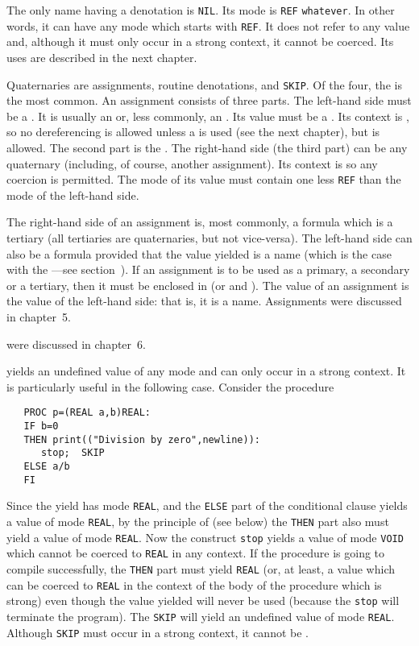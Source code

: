 The only name having a denotation is \verb|NIL|. Its mode is
\verb|REF| \verb|whatever|. In other words, it can have any mode
which starts with \verb|REF|. It does not refer to any value and,
although it must only occur in a strong context, it cannot be
coerced. Its uses are described in the next chapter.

Quaternaries are assignments, routine denotations,
 and \verb|SKIP|. Of the
four, the  is the most common.  An assignment consists
of three parts. The left-hand side must be a . It is
usually an  or, less commonly, an
. Its value must be a .
Its context is , so no dereferencing is
allowed unless a  is used (see the next chapter), but
 is allowed.  The second
part is the .  The right-hand side (the third
part) can be any quaternary (including, of course, another
assignment). Its context is  so any
coercion is permitted.  The mode of its value must contain one less
\verb|REF| than the mode of the left-hand side.

The right-hand side of an assignment is, most commonly, a formula
which is a tertiary (all tertiaries are quaternaries, but not
vice-versa).  The left-hand side can also be a formula provided that
the value yielded is a name (which is the case with the ---see section~). If an assignment is to
be used as a primary, a secondary or a tertiary, then it must be
enclosed in (or  and ).  The
value of an assignment is the value of the left-hand side: that is,
it is a name.  Assignments were discussed in chapter~5.

 were discussed in
chapter~6.

 yields an undefined value of any mode
and can only occur in a strong context. It is particularly useful in
the following case. Consider the procedure
\begin{verbatim}
   PROC p=(REAL a,b)REAL:
   IF b=0
   THEN print(("Division by zero",newline)):
      stop;  SKIP
   ELSE a/b
   FI
\end{verbatim}
\noindent
Since the yield has mode \verb|REAL|, and the \verb|ELSE| part of the
conditional clause yields a value of mode \verb|REAL|, by the principle
of  (see below) the \verb|THEN| part also
must yield a value of mode \verb|REAL|.  Now the construct \verb|stop|
yields a value of mode \verb|VOID| which cannot be coerced to
\verb|REAL| in any context.  If the procedure is going to compile
successfully, the \verb|THEN| part must yield \verb|REAL| (or, at
least, a value which can be coerced to \verb|REAL| in the context of
the body of the procedure which is strong) even though the value
yielded will never be used (because the \verb|stop| will terminate the
program).  The \verb|SKIP| will yield an undefined value of mode
\verb|REAL|.  Although \verb|SKIP| must occur in a strong context, it
cannot be .

